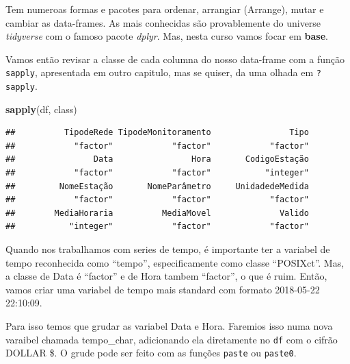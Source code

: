 \documentclass[]{book}
\newenvironment{Shaded}{\begin{snugshade}}{\end{snugshade}}
\newcommand{\KeywordTok}[1]{\textcolor[rgb]{0.13,0.29,0.53}{\textbf{#1}}}
\newcommand{\StringTok}[1]{\textcolor[rgb]{0.31,0.60,0.02}{#1}}
\newcommand{\OperatorTok}[1]{\textcolor[rgb]{0.81,0.36,0.00}{\textbf{#1}}}
\newcommand{\NormalTok}[1]{#1}
\begin{document}
Tem numeroas formas e pacotes para ordenar, arrangiar (Arrange), mutar e
cambiar as data-frames. As mais conhecidas são provablemente do universe
\emph{tidyverse} com o famoso pacote \emph{dplyr}. Mas, nesta curso
vamos focar em \textbf{base}.

Vamos então revisar a classe de cada columna do nosso data-frame com a
função \texttt{sapply}, apresentada em outro capitulo, mas se quiser, da
uma olhada em \texttt{?sapply}.

\begin{Shaded}
\begin{Highlighting}[]
\KeywordTok{sapply}\NormalTok{(df, class)}
\end{Highlighting}
\end{Shaded}

\begin{verbatim}
##          TipodeRede TipodeMonitoramento                Tipo 
##            "factor"            "factor"            "factor" 
##                Data                Hora       CodigoEstação 
##            "factor"            "factor"           "integer" 
##         NomeEstação       NomeParâmetro     UnidadedeMedida 
##            "factor"            "factor"            "factor" 
##        MediaHoraria          MediaMovel              Valido 
##           "integer"            "factor"            "factor"
\end{verbatim}

Quando nos trabalhamos com series de tempo, é importante ter a variabel
de tempo reconhecida como ``tempo'', especificamente como classe
``POSIXct''. Mas, a classe de Data é ``factor'' e de Hora tambem
``factor'', o que é ruim. Então, vamos criar uma variabel de tempo mais
standard com formato 2018-05-22 22:10:09.

Para isso temos que grudar as variabel Data e Hora. Faremios isso numa
nova varaibel chamada tempo\_char, adicionando ela diretamente no
\texttt{df} com o cifrão DOLLAR \$. O grude pode ser feito com as
funções \texttt{paste} ou \texttt{paste0}.

\begin{Shaded}
\end{Shaded}
\end{document}
